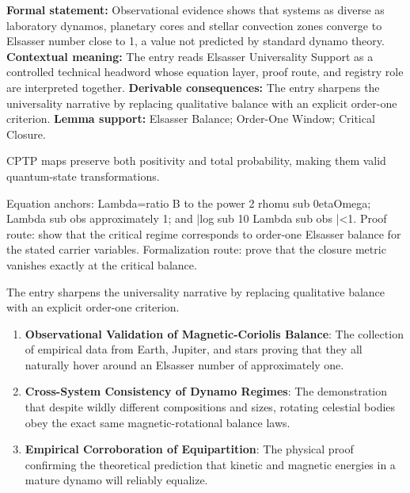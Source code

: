 \begingroup\footnotesize\setlength{\emergencystretch}{3em}\sloppy
\textbf{Formal statement:} Observational evidence shows that systems as diverse as laboratory dynamos, planetary cores and stellar convection zones converge to Elsasser number close to 1, a value not predicted by standard dynamo theory. \textbf{Contextual meaning:} The entry reads Elsasser Universality Support as a controlled technical headword whose equation layer, proof route, and registry role are interpreted together. \textbf{Derivable consequences:} The entry sharpens the universality narrative by replacing qualitative balance with an explicit order-one criterion. \textbf{Lemma support:} Elsasser Balance; Order-One Window; Critical Closure.\par
\endgroup

CPTP maps preserve both positivity and total probability, making them valid quantum-state transformations.

Equation anchors: Lambda=ratio B to the power 2 rhomu sub 0etaOmega; Lambda sub obs approximately 1; and |log sub 10 Lambda sub obs |<1. Proof route: show that the critical regime corresponds to order-one Elsasser balance for the stated carrier variables. Formalization route: prove that the closure metric vanishes exactly at the critical balance.

The entry sharpens the universality narrative by replacing qualitative balance with an explicit order-one criterion.
\endgroup

\begin{enumerate}[leftmargin=1.6em,itemsep=6pt,topsep=4pt]
\item \textbf{Observational Validation of Magnetic-Coriolis Balance}: The collection of empirical data from Earth, Jupiter, and stars proving that they all naturally hover around an Elsasser number of approximately one.
\item \textbf{Cross-System Consistency of Dynamo Regimes}: The demonstration that despite wildly different compositions and sizes, rotating celestial bodies obey the exact same magnetic-rotational balance laws.
\item \textbf{Empirical Corroboration of Equipartition}: The physical proof confirming the theoretical prediction that kinetic and magnetic energies in a mature dynamo will reliably equalize.
\end{enumerate}

